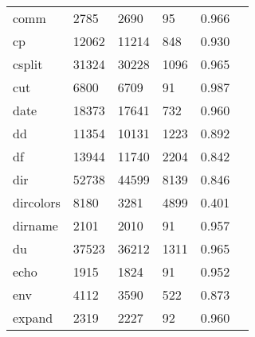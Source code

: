 \begin{longtable}{lp{2.4cm}p{2.4cm}p{2.4cm}p{2.4cm}p{2.4cm}}
comm      &                                    2785 &                        2690 &                           95 &                                   0.966 \\
cp        &                                   12062 &                       11214 &                          848 &                                   0.930 \\
csplit    &                                   31324 &                       30228 &                         1096 &                                   0.965 \\
cut       &                                    6800 &                        6709 &                           91 &                                   0.987 \\
date      &                                   18373 &                       17641 &                          732 &                                   0.960 \\
dd        &                                   11354 &                       10131 &                         1223 &                                   0.892 \\
df        &                                   13944 &                       11740 &                         2204 &                                   0.842 \\
dir       &                                   52738 &                       44599 &                         8139 &                                   0.846 \\
dircolors &                                    8180 &                        3281 &                         4899 &                                   0.401 \\
dirname   &                                    2101 &                        2010 &                           91 &                                   0.957 \\
du        &                                   37523 &                       36212 &                         1311 &                                   0.965 \\
echo      &                                    1915 &                        1824 &                           91 &                                   0.952 \\
env       &                                    4112 &                        3590 &                          522 &                                   0.873 \\
expand    &                                    2319 &                        2227 &                           92 &                                   0.960 \\

\end{longtable}

